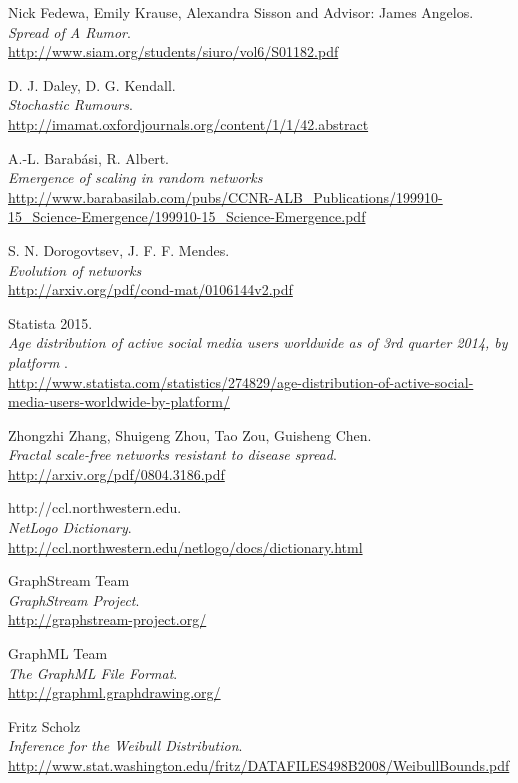 \newpage
\begin{thebibliography}{5}



Nick Fedewa, Emily Krause, Alexandra Sisson and Advisor: James Angelos.\\
\emph{Spread of A Rumor}.\\
\url{http://www.siam.org/students/siuro/vol6/S01182.pdf}

D. J. Daley, D. G. Kendall.\\
\emph{Stochastic Rumours}.\\
\url{http://imamat.oxfordjournals.org/content/1/1/42.abstract}

A.-L. Barabási, R. Albert.\\
\emph{Emergence of scaling in random networks}\\
\url{http://www.barabasilab.com/pubs/CCNR-ALB_Publications/199910-15_Science-Emergence/199910-15_Science-Emergence.pdf}

S. N. Dorogovtsev, J. F. F. Mendes.\\
\emph{Evolution of networks}\\
\url{http://arxiv.org/pdf/cond-mat/0106144v2.pdf}

Statista 2015.\\
\emph{Age distribution of active social media users worldwide as of 3rd quarter 2014, by platform }.\\
\url{http://www.statista.com/statistics/274829/age-distribution-of-active-social-media-users-worldwide-by-platform/}

Zhongzhi Zhang, Shuigeng Zhou, Tao Zou, Guisheng Chen.\\
\emph{Fractal scale-free networks resistant to disease spread}.\\
\url{http://arxiv.org/pdf/0804.3186.pdf}

http://ccl.northwestern.edu.\\
\emph{NetLogo Dictionary}.\\
\url{http://ccl.northwestern.edu/netlogo/docs/dictionary.html}

GraphStream Team\\
\emph{GraphStream Project}.\\
\url{http://graphstream-project.org/}

GraphML Team\\
\emph{The GraphML File Format}.\\
\url{http://graphml.graphdrawing.org/}

Fritz Scholz\\
\emph{Inference for the Weibull Distribution}.\\
\url{http://www.stat.washington.edu/fritz/DATAFILES498B2008/WeibullBounds.pdf}


\end{thebibliography}